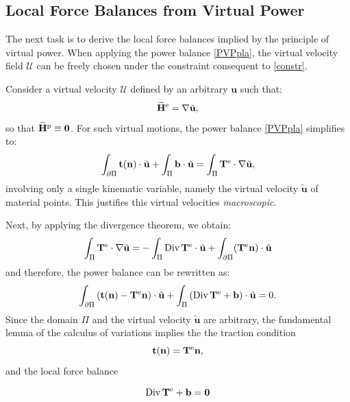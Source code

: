 %
%

\subsection{Local Force Balances from Virtual Power}

The next task is to derive the local force balances implied by the principle of virtual power. When applying the power balance \eqref{PVPpla}, the virtual velocity field \( \mathcal{U} \) can be freely chosen under the constraint consequent to \eqref{constr}.

Consider a virtual velocity \( \mathcal{U} \) defined by an arbitrary \( \mathbf{u} \) such that:
\begin{equation}
	\widetilde{\mathbf{H}}^{\rm e} = \nabla \tilde{\mathbf{u}},
	\end{equation}
	so that $\widetilde{\mathbf{H}}^{\rm p}\equiv \mathbf{0}$.
For such virtual motions, the power balance \eqref{PVPpla} simplifies to:
\[
\int_{\partial \Pi} \mathbf{t}(\mathbf{n}) \cdot \tilde{\mathbf{u}}  + \int_{\Pi} \mathbf{b} \cdot \tilde{\mathbf{u}}  = \int_{\Pi} \mathbf{T}^{\rm e} \cdot\nabla \tilde{\mathbf{u}} ,
\]
involving only a single kinematic variable, namely the virtual velocity \( \tilde{\mathbf{u}} \) of material points. This justifies this virtual velocities  \emph{macroscopic}.

Next, by applying the divergence theorem, we obtain:
\[
\int_{\Pi} \mathbf{T}^{\rm e} \cdot \nabla\tilde{ \mathbf{u}} = - \int_{\Pi} \text{Div} \, \mathbf{T}^{\rm e} \cdot \tilde{\mathbf{u}} + \int_{\partial \Pi} (\mathbf{T}^{\rm e} \mathbf{n}) \cdot \tilde{\mathbf{u}} 
\]
and therefore, the power  balance  can be rewritten as:
\[
\int_{\partial \Pi} \left( \mathbf{t}(\mathbf{n}) - \mathbf{T}^{\rm e} \mathbf{n} \right) \cdot \tilde{\mathbf{u}}  + \int_{\Pi} \left( \text{Div} \, \mathbf{T}^{\rm e} + \mathbf{b} \right) \cdot \tilde{\mathbf{u}}  = 0.
\]
Since the domain \( \Pi \) and the virtual velocity \( \tilde{\mathbf{u}} \) are arbitrary, the fundamental lemma of the calculus of variations implies the the traction condition
\begin{equation}
	\mathbf{t}(\mathbf{n}) = \mathbf{T}^{\rm e} \mathbf{n}, 
\end{equation}
and the  local force balance
\begin{definition}
\begin{equation}\label{balTe}
	\text{Div} \, \mathbf{T}^{\rm e} + \mathbf{b} = \mathbf{0}
\end{equation}
\end{definition}

